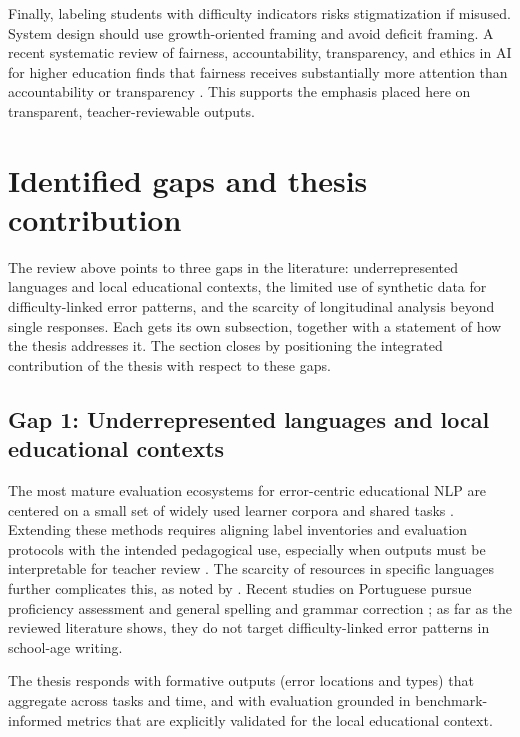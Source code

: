 Finally, labeling students with difficulty indicators risks stigmatization if misused. System design should use growth-oriented framing and avoid deficit framing. A recent systematic review of fairness, accountability, transparency, and ethics in AI for higher education finds that fairness receives substantially more attention than accountability or transparency \parencite{MemarianDoleck2023}. This supports the emphasis placed here on transparent, teacher-reviewable outputs.

\section{Identified gaps and thesis contribution}
\label{sec:sota_gaps}

The review above points to three gaps in the literature: underrepresented languages and local educational contexts, the limited use of synthetic data for difficulty-linked error patterns, and the scarcity of longitudinal analysis beyond single responses. Each gets its own subsection, together with a statement of how the thesis addresses it. The section closes by positioning the integrated contribution of the thesis with respect to these gaps.

\subsection{Gap 1: Underrepresented languages and local educational contexts}
\label{sec:sota_gap_pt}

The most mature evaluation ecosystems for error-centric educational NLP are centered on a small set of widely used learner corpora and shared tasks \parencite{Ng2014,Bryant2019,BryantFeliceBriscoe2017}. Extending these methods requires aligning label inventories and evaluation protocols with the intended pedagogical use, especially when outputs must be interpretable for teacher review \parencite{Bryant2023GECsurvey,Woolf2010}. The scarcity of resources in specific languages further complicates this, as noted by \textcite{Joshi2020}. Recent studies on Portuguese pursue proficiency assessment \parencite{Akef2026} and general spelling and grammar correction \parencite{Cabral2026}; as far as the reviewed literature shows, they do not target difficulty-linked error patterns in school-age writing.

The thesis responds with formative outputs (error locations and types) that aggregate across tasks and time, and with evaluation grounded in benchmark-informed metrics that are explicitly validated for the local educational context.

